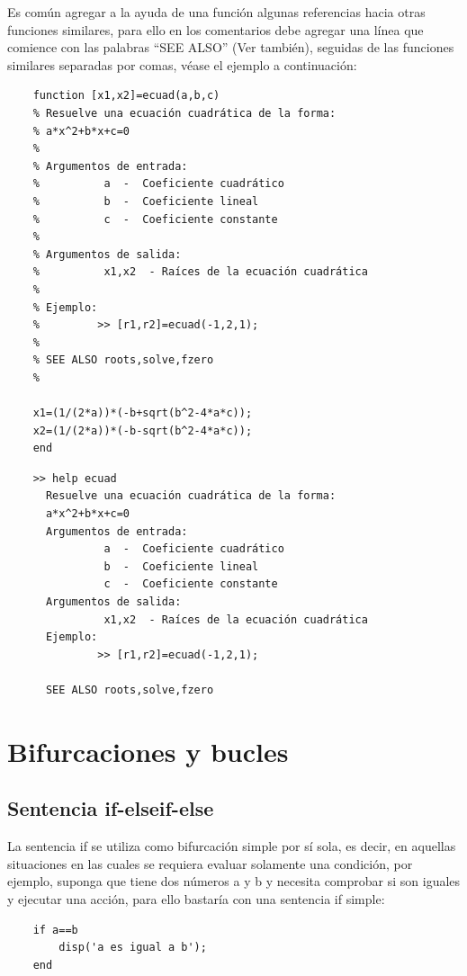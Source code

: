 Es común agregar a la ayuda de una función algunas referencias hacia otras funciones 
similares, para ello en los comentarios debe agregar una línea que comience con las 
palabras “SEE ALSO” (Ver también), seguidas de las funciones similares separadas por 
comas, véase el ejemplo a continuación:

\begin{verbatim}
	function [x1,x2]=ecuad(a,b,c)
	% Resuelve una ecuación cuadrática de la forma:
	% a*x^2+b*x+c=0
	%
	% Argumentos de entrada:
	%          a  -  Coeficiente cuadrático
	%          b  -  Coeficiente lineal
	%          c  -  Coeficiente constante
	%
	% Argumentos de salida:
	%          x1,x2  - Raíces de la ecuación cuadrática 
	%
	% Ejemplo:
	%         >> [r1,r2]=ecuad(-1,2,1);
	%
	% SEE ALSO roots,solve,fzero
	%
	 
	x1=(1/(2*a))*(-b+sqrt(b^2-4*a*c));
	x2=(1/(2*a))*(-b-sqrt(b^2-4*a*c));
	end
\end{verbatim}

\begin{verbatim}
	>> help ecuad
	  Resuelve una ecuación cuadrática de la forma:
	  a*x^2+b*x+c=0 
	  Argumentos de entrada:
	           a  -  Coeficiente cuadrático
	           b  -  Coeficiente lineal
	           c  -  Coeficiente constante
	  Argumentos de salida:
	           x1,x2  - Raíces de la ecuación cuadrática 
	  Ejemplo:
	          >> [r1,r2]=ecuad(-1,2,1);

	  SEE ALSO roots,solve,fzero
\end{verbatim}

\section{Bifurcaciones y bucles}

\subsection{Sentencia if-elseif-else}

La sentencia if se utiliza  como bifurcación simple por sí sola, es decir, en aquellas 
situaciones en las cuales se requiera evaluar solamente una condición, por ejemplo, 
suponga que tiene dos números a y b y necesita comprobar si son iguales y ejecutar una 
acción, para ello bastaría con una sentencia if simple:

\begin{verbatim}
	if a==b
	    disp('a es igual a b');
	end
\end{verbatim}

